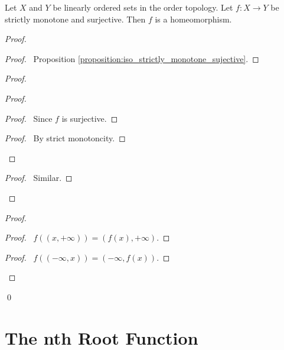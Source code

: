 \begin{proposition}
    \label{proposition:homeomorphism_order_topology}
    Let $X$ and $Y$ be linearly ordered sets in the order topology. Let $f : X \rightarrow Y$ be strictly monotone and surjective. Then $f$ is a homeomorphism.
\end{proposition}

\begin{proof}
    \pf
    \begin{proof}
        \pf\ Proposition \ref{proposition:iso_strictly_monotone_sujective}.
    \end{proof}
    \begin{proof}
        \begin{proof}
            \begin{proof}
                \pf\ Since $f$ is surjective.
            \end{proof}
            \begin{proof}
                \pf\ By strict monotoncity.
            \end{proof}
        \end{proof}
        \begin{proof}
            \pf\ Similar.
        \end{proof}
    \end{proof}
    \begin{proof}
        \begin{proof}
            \pf\ $f((x, +\infty)) = (f(x), +\infty)$.
        \end{proof}
        \begin{proof}
            \pf\ $f((-\infty, x)) = (-\infty, f(x))$.
        \end{proof}
    \end{proof}
    \qed
\end{proof}

\section{The nth Root Function}

